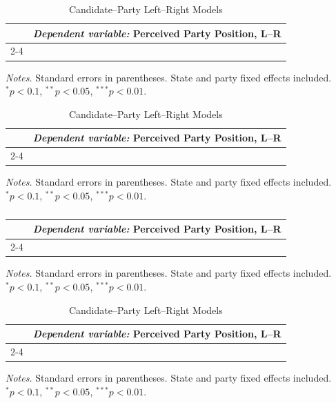 \begin{table}[!htbp]\centering
\caption{Candidate--Party Left--Right Models}
\label{tab:cand_party_lr}
\begin{tabular}{lccc}
\toprule
 & \multicolumn{3}{c}{\textit{Dependent variable:} Perceived Party Position, L--R} \\
\cmidrule(lr){2-4}
\bottomrule
\end{tabular}
\vspace{0.2em}
{\footnotesize \textit{Notes.} Standard errors in parentheses. State and party fixed effects included. \\$^{*}p<0.1$, $^{**}p<0.05$, $^{***}p<0.01$.}
\end{table}

\begin{table}[!htbp]\centering
\caption{Candidate--Party Left--Right Models}
\label{tab:cand_party_lr}
\begin{tabular}{lccc}
\toprule
 & \multicolumn{3}{c}{\textit{Dependent variable:} Perceived Party Position, L--R} \\
\cmidrule(lr){2-4}
\bottomrule
\end{tabular}
\vspace{0.2em}
{\footnotesize \textit{Notes.} Standard errors in parentheses. State and party fixed effects included. \\$^{*}p<0.1$, $^{**}p<0.05$, $^{***}p<0.01$.}
\end{table}

\begin{table}[!htbp]\centering
\caption{Candidate--Party Left--Right Models}
\label{tab:cand_party_lr}
\begin{tabular}{lccc}
\toprule
 & \multicolumn{3}{c}{\textit{Dependent variable:} Perceived Party Position, L--R} \\
\cmidrule(lr){2-4}
  \caption{} \bottomrule
\end{tabular}
\vspace{0.2em}
{\footnotesize \textit{Notes.} Standard errors in parentheses. State and party fixed effects included. \\$^{*}p<0.1$, $^{**}p<0.05$, $^{***}p<0.01$.}
\end{table}

\begin{table}[!htbp]\centering
\caption{Candidate--Party Left--Right Models}
\label{tab:cand_party_lr}
\begin{tabular}{lccc}
\toprule
 & \multicolumn{3}{c}{\textit{Dependent variable:} Perceived Party Position, L--R} \\
\cmidrule(lr){2-4}
  \label{} \bottomrule
\end{tabular}
\vspace{0.2em}
{\footnotesize \textit{Notes.} Standard errors in parentheses. State and party fixed effects included. \\$^{*}p<0.1$, $^{**}p<0.05$, $^{***}p<0.01$.}
\end{table}

